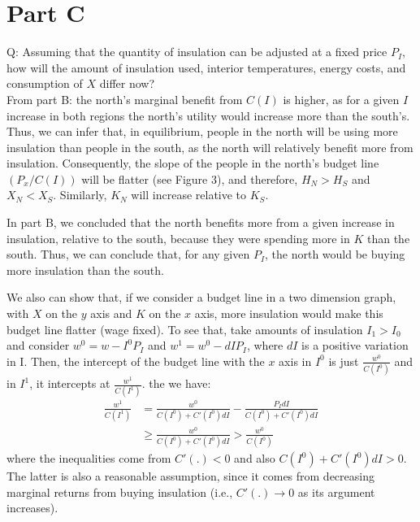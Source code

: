 \documentclass[12pt]{paper}
\begin{document}
\section{Part C}
Q: Assuming that the quantity of insulation can be adjusted at a fixed price $P_I$, how will the amount of insulation used, interior temperatures, energy costs, and consumption of $X$ differ now?
\\

From part B: the north's marginal benefit from $C(I)$ is higher, as for a given $I$ increase in both regions the north's utility would increase more than the south's. Thus, we can infer that, in equilibrium, people in the north will be using more insulation than people in the south, as the north will relatively benefit more from insulation.
Consequently, the slope of the people in the north's budget line $(P_x/C(I))$ will be flatter (see Figure 3), and therefore, $H_N>H_S$ and $X_N<X_S$. Similarly, $K_N$ will increase relative to $K_S$.
  
In part B, we concluded that the north benefits more from a given increase in insulation, relative to the south, because they were spending more in $K$ than the south. Thus, we can conclude that, for any given $P_I$, the north would be buying more insulation than the south.

We also can show that, if we consider a budget line in a two dimension graph, with $X$ on the $y$ axis and $K$ on the $x$ axis, more insulation would make this budget line flatter (wage fixed). To see that, take amounts of insulation $I_1>I_0$ and consider $w^0=w-I^0P_I$ and $w^1=w^0-dIP_I$, where $dI$ is a positive variation in I. Then, the intercept of the budget line with the $x$ axis in $I^0$ is just $\frac{w^0}{C(I^0)}$ and in $I^1$, it intercepts at $\frac{w^1}{C(I^1)}$. the we have:
\begin{equation}
\begin{split}
\frac{w^1}{C(I^1)}&=\frac{w^0}{C(I^0)+C'(I^0)dI}-\frac{P_IdI}{C(I^0)+C'(I^0)dI}\\
&\ge \frac{w^0}{C(I^0)+C'(I^0)dI}>\frac{w^0}{C(I^0)}
\end{split}
\end{equation}
\noindent where the inequalities come from $C'(.)<0$ and also $C(I^0)+C'(I^0)dI>0$. The latter is also a reasonable assumption, since it comes from decreasing marginal returns from buying insulation (i.e., $C'(.)\to 0$ as its argument increases).
\end{document}
